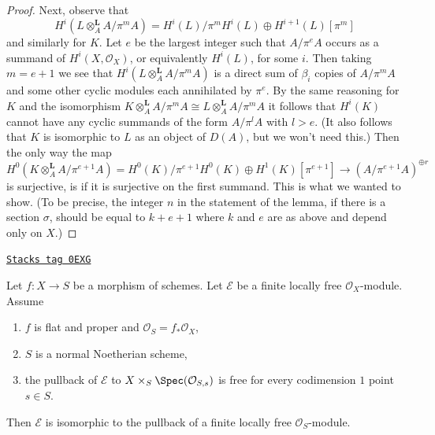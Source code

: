 \begin{proof}
Next, observe that
$$
H^i(L \otimes_A^\mathbf{L} A/\pi^m A) =
H^i(L)/\pi^m H^i(L) \oplus H^{i + 1}(L)[\pi^m]
$$
and similarly for $K$. Let $e$ be the largest integer
such that $A/\pi^eA$ occurs as a summand of $H^i(X, \mathcal{O}_X)$,
or equivalently $H^i(L)$, for some $i$. Then taking $m = e + 1$
we see that $H^i(L \otimes_A^\mathbf{L} A/\pi^m A)$ is a direct sum of
$\beta_i$ copies of $A/\pi^m A$ and some other cyclic modules
each annihilated by $\pi^e$. By the same reasoning for $K$
and the isomorphism
$K \otimes_A^\mathbf{L} A/\pi^m A \cong L \otimes_A^\mathbf{L} A/\pi^m A$
it follows that $H^i(K)$
cannot have any cyclic summands of the form $A/\pi^l A$
with $l > e$. (It also follows that $K$ is isomorphic to $L$
as an object of $D(A)$, but we won't need this.)
Then the only way the map
$$
H^0(K \otimes^\mathbf{L}_A A/\pi^{e + 1} A) =
H^0(K)/\pi^{e + 1}H^0(K) \oplus H^1(K)[\pi^{e + 1}]
\longrightarrow
(A/\pi^{e + 1} A)^{\oplus r}
$$
is surjective, is if it is surjective on the
first summand. This is what we wanted to show.
(To be precise, the integer $n$ in the statement of
the lemma, if there is a section $\sigma$,
should be equal to $k + e + 1$ where $k$ and $e$ are as above
and depend only on $X$.)
\end{proof}

\begin{lemma}
\label{flat-lemma-trivial-over-dvrs}
\href{https://stacks.math.columbia.edu/tag/0EXG}{\texttt{Stacks tag 0EXG}}

Let $f : X \to S$ be a morphism of schemes.
Let $\mathcal{E}$ be a finite locally free $\mathcal{O}_X$-module.
Assume
\begin{enumerate}
\item $f$ is flat and proper and $\mathcal{O}_S = f_*\mathcal{O}_X$,
\item $S$ is a normal Noetherian scheme,
\item the pullback of $\mathcal{E}$ to $X \times_S \Spec(\mathcal{O}_{S, s})$
is free for every codimension $1$ point $s \in S$.
\end{enumerate}
Then $\mathcal{E}$ is isomorphic to the pullback of a finite
locally free $\mathcal{O}_S$-module.
\end{lemma}

